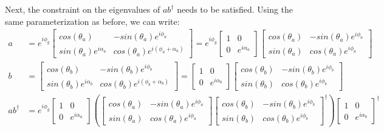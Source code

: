 Next, the constraint on the eigenvalues of $ab^\dagger$ needs to be satisfied.
Using the same parameterization as before, we can write:
\begin{align}
a &= e^{i\phi_g}\begin{bmatrix}cos(\theta_a)&-sin(\theta_a)e^{i\phi_a}\\
  sin(\theta_a)e^{i\alpha_a}&cos(\theta_a)e^{i(\phi_a + \alpha_a)}\end{bmatrix}
  = e^{i\phi_g}\begin{bmatrix}1&0\\0&e^{i\alpha_a}\end{bmatrix}\begin{bmatrix}
  cos(\theta_a)&-sin(\theta_a)e^{i\phi_a}\\sin(\theta_a)&cos(\theta_a)e^{i\phi_a}
  \end{bmatrix} \nonumber \\
b &= \begin{bmatrix}cos(\theta_b)&-sin(\theta_b)e^{i\phi_b}\\
  sin(\theta_b)e^{i\alpha_b}&cos(\theta_b)e^{i(\phi_b + \alpha_b)}\end{bmatrix}
  = \begin{bmatrix}1&0\\0&e^{i\alpha_b}\end{bmatrix}\begin{bmatrix}cos(\theta_b)
  &-sin(\theta_b)e^{i\phi_b}\\sin(\theta_b)&cos(\theta_b)e^{i\phi_b}\end{bmatrix}
  \nonumber \\
ab^\dagger &= e^{i\phi_g}\begin{bmatrix}1&0\\0&e^{i\alpha_a}\end{bmatrix}\left(
  \begin{bmatrix}cos(\theta_a)&-sin(\theta_a)e^{i\phi_a}\\
  sin(\theta_a)&cos(\theta_a)e^{i\phi_a}\end{bmatrix}\begin{bmatrix}
  cos(\theta_b)&-sin(\theta_b)e^{i\phi_b}\\sin(\theta_b)
  &cos(\theta_b)e^{i\phi_b}\end{bmatrix}^\dagger\right)\begin{bmatrix}1&0\\
  0&e^{i\alpha_b}\end{bmatrix}^\dagger \label{abt}
\end{align}

